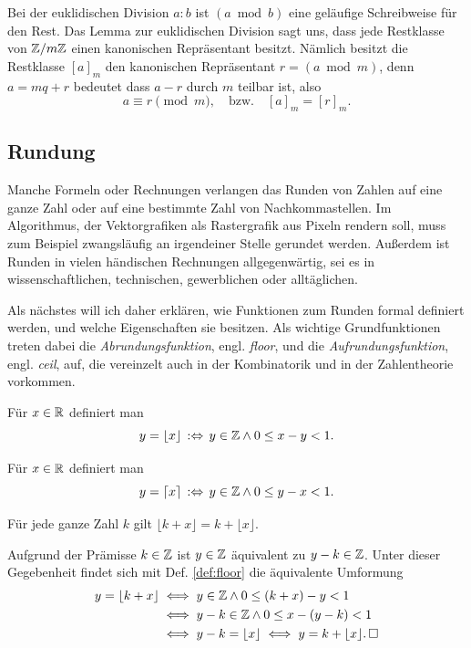 Bei der euklidischen Division $a:b$ ist $(a\bmod b)$ eine geläufige
Schreibweise für den Rest. Das Lemma zur euklidischen Division sagt uns,
dass jede Restklasse von $\mathbb Z/m\mathbb Z$ einen kanonischen Repräsentant
besitzt. Nämlich besitzt die Restklasse $[a]_m$ den kanonischen
Repräsentant $r=(a\bmod m)$, denn $a=mq+r$ bedeutet dass $a-r$ durch
$m$ teilbar ist, also
\[a\equiv r\pmod m,\quad\text{bzw.}\quad [a]_m = [r]_m.\]


\subsection{Rundung}

Manche Formeln oder Rechnungen verlangen das Runden von Zahlen auf
eine ganze Zahl oder auf eine bestimmte Zahl von Nachkommastellen.
Im Algorithmus, der Vektorgrafiken als Rastergrafik aus Pixeln rendern
soll, muss zum Beispiel zwangsläufig an irgendeiner Stelle gerundet
werden. Außerdem ist Runden in vielen händischen Rechnungen
allgegenwärtig, sei es in wissenschaftlichen, technischen, gewerblichen
oder alltäglichen.

Als nächstes will ich daher erklären, wie Funktionen zum Runden formal
definiert werden, und welche Eigenschaften sie besitzen. Als wichtige
Grundfunktionen treten dabei die \emph{Abrundungsfunktion}, engl.
\emph{floor}, und die \emph{Aufrundungsfunktion}, engl. \emph{ceil},
auf, die vereinzelt auch in der Kombinatorik und in der Zahlentheorie
vorkommen.

\begin{Definition}[Floor]\label{def:floor}
Für $x\in\mathbb R$ definiert man
\[y = \lfloor x\rfloor\,:\Leftrightarrow\, y\in\mathbb Z\land 0\le x-y < 1.\]
\end{Definition}

\begin{Definition}[Ceil]\label{def:ceil}
Für $x\in\mathbb R$ definiert man
\[y = \lceil x\rceil\,:\Leftrightarrow\, y\in\mathbb Z\land 0\le y-x < 1.\]
\end{Definition}

\begin{Satz}\label{floor-add-int}
Für jede ganze Zahl $k$ gilt $\lfloor k + x\rfloor = k + \lfloor x\rfloor$.
\end{Satz}
\begin{Beweis} Aufgrund der Prämisse $k\in\mathbb Z$ ist $y\in\mathbb Z$ äquivalent
zu $y-k\in\mathbb Z$. Unter dieser Gegebenheit findet sich mit
Def. \ref{def:floor} die äquivalente Umformung
\begin{align*}
y = \lfloor k+x\rfloor &\iff y\in\mathbb Z\land 0\le (k+x)-y < 1\\
&\iff y-k\in\mathbb Z\land 0\le x-(y-k) < 1\\
&\iff y - k = \lfloor x\rfloor \iff y = k + \lfloor x\rfloor.\,\Box
\end{align*}
\end{Beweis}

